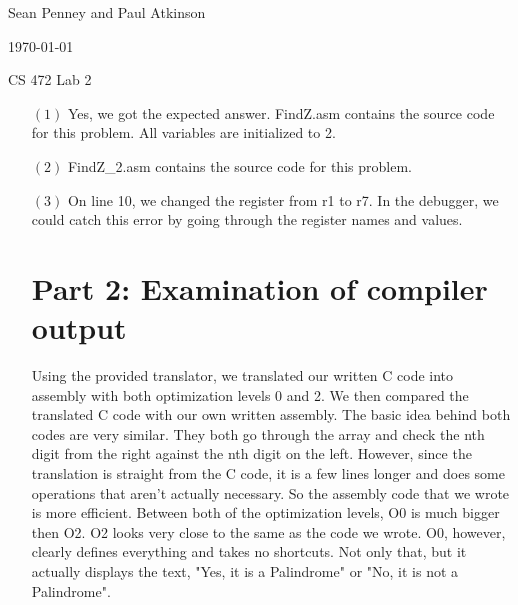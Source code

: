\documentclass[letterpaper,10pt,titlepage]{article}
\def\name{Sean Penney and Paul Atkinson}
\begin{document}
\hfill \name

\hfill \today

\hfill CS 472 Lab 2

\begin{enumerate}

\section*{Part 1: Problem Set 5}
\item[$(1)$] Yes, we got the expected answer.  FindZ.asm contains the source code for this problem.  All variables are initialized to 2.

\item[$(2)$] FindZ\_2.asm contains the source code for this problem.

\item[$(3)$] On line 10, we changed the register from r1 to r7.  In the debugger, we could catch this error by going through the register names and values.

\section*{Part 2: Examination of compiler output}

Using the provided translator, we translated our written C code into assembly with both 
optimization levels 0 and 2. We then compared the translated C code with our own written 
assembly. The basic idea behind both codes are very similar. They both go through the array 
and check the nth digit from the right against the nth digit on the left. However, since 
the translation is straight from the C code, it is a few lines longer and does some operations 
that aren't actually necessary. So the assembly code that we wrote is more efficient. Between 
both of the optimization levels, O0 is much bigger then O2. O2 looks very close to the same 
as the code we wrote. O0, however, clearly defines everything and takes no shortcuts. Not 
only that, but it actually displays the text, "Yes, it is a Palindrome" or "No, it is not a Palindrome".

  
\end{enumerate}
\end{document}
